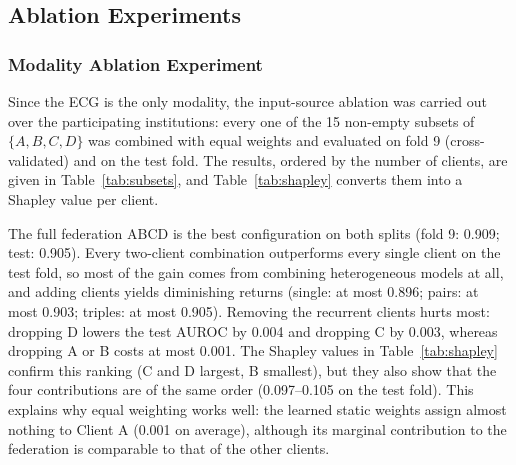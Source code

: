 \subsection{Ablation Experiments}
\label{sec:ablation}

\subsubsection{Modality Ablation Experiment}
Since the ECG is the only modality, the input-source ablation was carried out over the
participating institutions: every one of the 15 non-empty subsets of $\{A,B,C,D\}$ was combined with
equal weights and evaluated on fold 9 (cross-validated) and on the test fold. The results, ordered by
the number of clients, are given in Table~\ref{tab:subsets}, and Table~\ref{tab:shapley} converts them
into a Shapley value per client.
\begin{table}[!t]
\centering
\caption{Client-subset ablation (equal-weight gate; mean over 3 seeds, test SD shown)}
\label{tab:subsets}
\footnotesize
\setlength{\tabcolsep}{4pt}

\end{table}

The full federation ABCD is the best configuration on both splits (fold 9: 0.909; test: 0.905).
Every two-client combination outperforms every single client on the test fold, so most of the gain
comes from combining heterogeneous models at all, and adding clients yields diminishing returns
(single: at most 0.896; pairs: at most 0.903; triples: at most 0.905). Removing the recurrent clients
hurts most: dropping D lowers the test AUROC by 0.004 and dropping C by 0.003, whereas dropping A or B
costs at most 0.001. The Shapley values in Table~\ref{tab:shapley} confirm this ranking (C and D
largest, B smallest), but they also show that the four contributions are of the same order
(0.097--0.105 on the test fold). This explains why equal weighting works well: the learned static
weights assign almost nothing to Client A (0.001 on average), although its marginal contribution to
the federation is comparable to that of the other clients.

\begin{table}[!t]
\centering
\caption{Shapley value $\phi_i$ of each client for the macro AUROC of the equal-weight federation
($v(\emptyset)=0.5$) and the mean learned static weight}
\label{tab:shapley}
\footnotesize
\setlength{\tabcolsep}{4pt}

\end{table}

